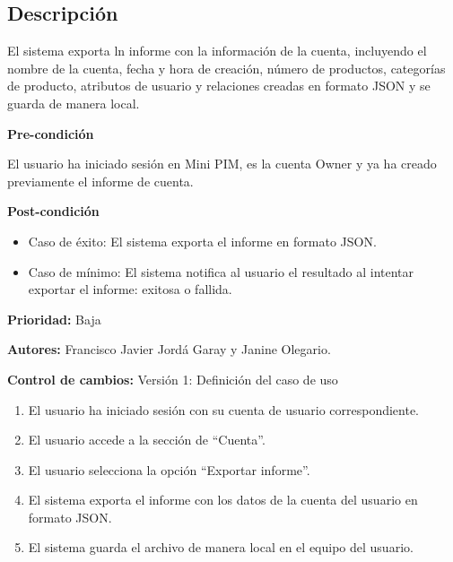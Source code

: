 
\subsection*{Descripción}
El sistema exporta ln informe con la información de la cuenta, incluyendo el
nombre de la cuenta, fecha y hora de creación, número de productos, categorías 
de producto, atributos de usuario y relaciones creadas en formato JSON y se guarda de manera local.

\vspace{0.15cm}

\textbf{Pre-condición}\par
El usuario ha iniciado sesión en Mini PIM, es la cuenta Owner y ya ha creado previamente el informe de cuenta.\par
\vspace{0.15cm}

\textbf{Post-condición}
\begin{itemize}
    \item Caso de éxito: El sistema exporta el informe en formato JSON.
    \item Caso de mínimo: El sistema notifica al usuario el resultado al intentar exportar el informe: exitosa o fallida.
\end{itemize}

\textbf{Prioridad:}
Baja
\vspace{0.15cm}

\textbf{Autores: }
Francisco Javier Jordá Garay y Janine Olegario.\par
\vspace{0.15cm}

\textbf{Control de cambios: } Versión 1: Definición del caso de uso

\begin{enumerate}
    \item El usuario ha iniciado sesión con su cuenta de usuario correspondiente.
    \item El usuario accede a la sección de \enquote{Cuenta}.
    \item El usuario selecciona la opción \enquote{Exportar informe}.
    \item El sistema exporta el informe con los datos de la cuenta del usuario en formato JSON.
    \item El sistema guarda el archivo de manera local en el equipo del usuario.
\end{enumerate}

